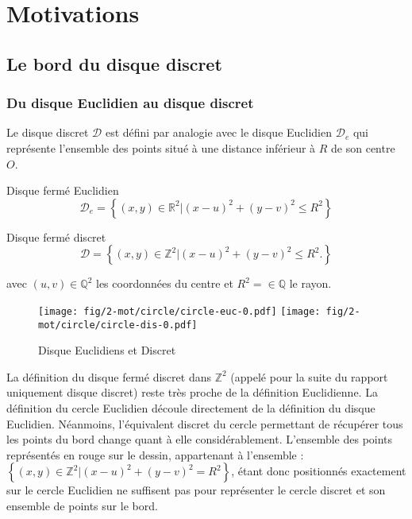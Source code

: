 \section{Motivations}

\subsection{Le bord du disque discret}

\subsubsection{Du disque Euclidien au disque discret}


Le disque discret $\mathcal{D}$ est défini par analogie avec le disque Euclidien $\mathcal{D}_e$ qui représente l'ensemble des points situé à une distance inférieur à $R$ de son centre $O$.


\begin{Definition}{Disque fermé Euclidien}
\label{def:disk-euc}
 $$\mathcal{D}_e =  \left\{ (x,y) \in \mathbb{R}^{2} |  (x - u)^2 + (y - v)^2 \leq R^2 \right\}$$
\end{Definition}

\begin{Definition}{Disque fermé discret}
\label{def:disk-dis}
  $$\mathcal{D} =  \left\{ (x,y) \in \mathbb{Z}^{2} |  (x - u)^2 + (y - v)^2 \leq R^2. \right\}$$
  
  avec $(u,v) \in \mathbb{Q}^{2}$ les coordonnées du centre et $R^2 = \in \mathbb{Q}$ le rayon.\\
\end{Definition}

\begin{figure}[H]
  \centering
  \texttt{[image: fig/2-mot/circle/circle-euc-0.pdf]}
  \texttt{[image: fig/2-mot/circle/circle-dis-0.pdf]}
  \caption{Disque Euclidiens et Discret}
\end{figure}

La définition du disque fermé discret dans $\mathbb{Z}^{2}$ (appelé pour la suite du rapport uniquement disque discret) reste très proche de la définition Euclidienne. La définition du cercle Euclidien découle directement de la définition du disque Euclidien. Néanmoins, l'équivalent discret du cercle permettant de récupérer tous les points du bord change quant à elle considérablement. L'ensemble des points représentés en rouge sur le dessin, appartenant à l'ensemble : $\left\{ (x,y) \in \mathbb{Z}^{2} |  (x - u)^2 + (y - v)^2 = R^2 \right\}$, étant donc positionnés exactement sur le cercle Euclidien ne suffisent pas pour représenter le cercle discret et son ensemble de points sur le bord. 

